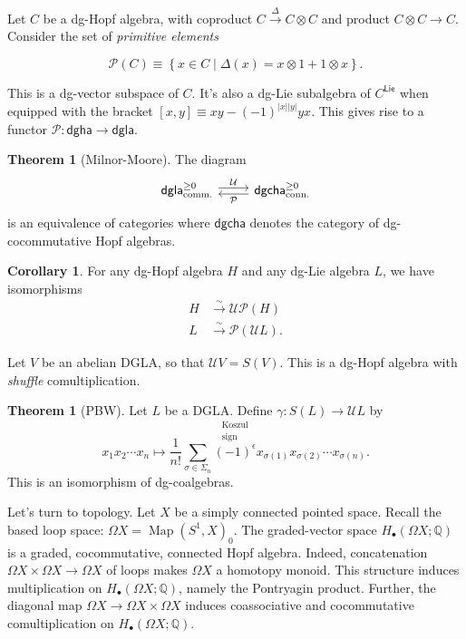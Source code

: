 \documentclass[10pt,letterpaper,cm]{nupset}
\theoremstyle{definition}
\theoremstyle{theorem}
\newtheorem{theorem}[defn]{Theorem}
\newtheorem{corollary}[defn]{Corollary}
\theoremstyle{remark}
\renewcommand{\P}{\mathcal P}
\newcommand{\Q}{\mathbb Q}
\newcommand{\U}{\mathcal U}
\newcommand{\1}{\mathbb{1}}
\newcommand{\0}{\vec 0}
\DeclareMathOperator{\map}{Map}
\begin{document}
\medskip

Let $C$ be a dg-Hopf algebra, with coproduct $C \xrightarrow{\Delta} C \otimes C$ and product $C \otimes C \to C$. Consider the set of \textit{primitive elements}

\[
\P(C) \equiv \left\{ x \in C \mid \Delta(x) = x \otimes 1 + 1 \otimes x\right\}.
\]

This is a dg-vector subspace of $C$. It's also a dg-Lie subalgebra of $C^{\mathsf{Lie}}$ when equipped with the bracket $\left[x,y\right] \equiv xy - \left({-1}\right)^{\left\lvert{x}\right\rvert \left\lvert{y}\right\rvert}yx$. This gives rise to a functor $\P : \mathsf{dgha} \to \mathsf{dgla}$.

\begin{theorem}[Milnor-Moore]
The diagram 
\[
\begin{tikzcd}
	{\mathsf{dgla}_{\text{comm.}}^{\geq 0}} & {\mathsf{dgcha}_{\text{conn.}}^{\geq 0}}
	\arrow["\U", shift left=1, from=1-1, to=1-2]
	\arrow["\P", shift left=1, from=1-2, to=1-1]
\end{tikzcd}
\] is an equivalence of categories where $\mathsf{dgcha}$ denotes the category of dg-cocommutative Hopf algebras. 
\end{theorem}

\begin{corollary}
For any dg-Hopf algebra $H$ and any dg-Lie algebra $L$, we have isomorphisms
\begin{align*}
H &  \xrightarrow{\sim} \U{\P(H)}
\\ L & \xrightarrow{\sim}  \P(\U{L}) 
.\end{align*}
\end{corollary}

Let $V$ be an abelian DGLA, so that $\U{V} = S(V)$. This is a dg-Hopf algebra with \textit{shuffle} comultiplication. 

\begin{theorem}[PBW]
Let $L$ be a DGLA. Define $\gamma : S(L) \to \U{L}$ by 
\[
x_1 x_2\cdots x_n \mapsto \frac{1}{n!}\sum_{\sigma \in \Sigma_n} \overset{\substack{\text{Koszul} \\ \text{sign}}}{\left({-1}\right)^{\epsilon}}x_{\sigma(1)}x_{\sigma(2)} \cdots x_{\sigma(n)}
.\] This is an isomorphism of dg-coalgebras.
\end{theorem}


\medskip

Let's turn to topology. Let $X$ be a simply connected pointed space. Recall the based loop space:
$\Omega{X} = \map(S^1, X)_0$. The graded-vector space $H_{\bullet}(\Omega{X}; \Q)$ is a graded, cocommutative, connected Hopf algebra. Indeed, concatenation $\Omega{X} \times \Omega{X} \to \Omega{X}$ of loops makes $\Omega{X}$ a homotopy monoid. This structure induces multiplication on $H_{\bullet}(\Omega{X}; \Q)$, namely the Pontryagin product. Further, the diagonal map $\Omega{X} \to \Omega{X} \times \Omega{X}$ induces coassociative and cocommutative comultiplication on $H_{\bullet}(\Omega{X}; \Q)$.
\end{document}
